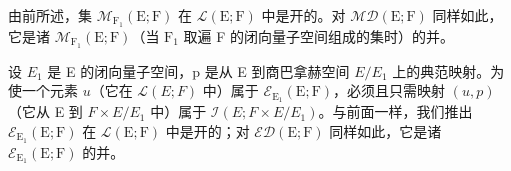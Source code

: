 由前所述，集 \(\mathcal{M}_{\mathrm{F}_1}(\mathrm{E};\mathrm{F})\) 在 \(\mathcal{L}(\mathrm{E};\mathrm{F})\) 中是开的。对 \(\mathcal{MD}(\mathrm{E};\mathrm{F})\) 同样如此，它是诸 \(\mathcal{M}_{\mathrm{F}_1}(\mathrm{E};\mathrm{F})\)（当 \(\mathrm{F}_1\) 取遍 F 的闭向量子空间组成的集时）的并。

设 \(E_{1}\) 是 E 的闭向量子空间，p 是从 E 到商巴拿赫空间 \(E/E_{1}\) 上的典范映射。为使一个元素 \(u\)（它在 \(\mathcal{L}(E;F)\) 中）属于 \(\mathcal{E}_{\mathrm{E}_{1}}(\mathrm{E};\mathrm{F})\)，必须且只需映射 \((u,p)\)（它从 E 到 \(F\times E/E_{1}\) 中）属于 \(\mathcal{I}(E;F\times E/E_{1})\)。与前面一样，我们推出 \(\mathcal{E}_{\mathrm{E}_{1}}(\mathrm{E};\mathrm{F})\) 在 \(\mathcal{L}(\mathrm{E};\mathrm{F})\) 中是开的；对 \(\mathcal{E}\mathcal{D}(\mathrm{E};\mathrm{F})\) 同样如此，它是诸 \(\mathcal{E}_{\mathrm{E}_{1}}(\mathrm{E};\mathrm{F})\) 的并。

